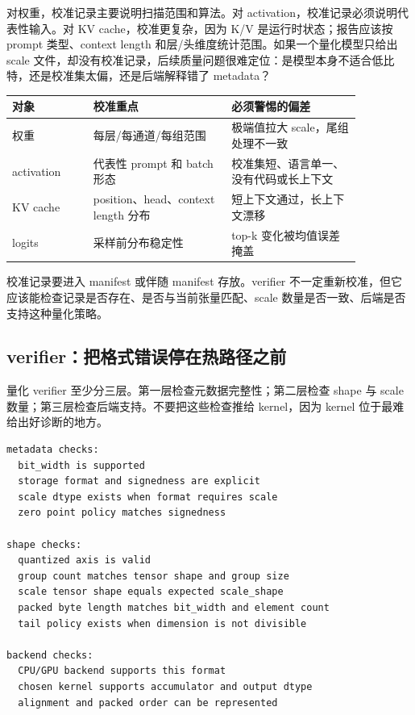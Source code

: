 对权重，校准记录主要说明扫描范围和算法。对 activation，校准记录必须说明代表性输入。对 KV cache，校准更复杂，因为 K/V 是运行时状态；报告应该按 prompt 类型、context length 和层/头维度统计范围。如果一个量化模型只给出 scale 文件，却没有校准记录，后续质量问题很难定位：是模型本身不适合低比特，还是校准集太偏，还是后端解释错了 metadata？

\begin{center}
\begin{tabular}{p{0.20\linewidth}p{0.34\linewidth}p{0.32\linewidth}}
\toprule
对象 & 校准重点 & 必须警惕的偏差 \\
\midrule
权重 & 每层/每通道/每组范围 & 极端值拉大 scale，尾组处理不一致 \\
activation & 代表性 prompt 和 batch 形态 & 校准集短、语言单一、没有代码或长上下文 \\
KV cache & position、head、context length 分布 & 短上下文通过，长上下文漂移 \\
logits & 采样前分布稳定性 & top-k 变化被均值误差掩盖 \\
\bottomrule
\end{tabular}
\end{center}

校准记录要进入 manifest 或伴随 manifest 存放。verifier 不一定重新校准，但它应该能检查记录是否存在、是否与当前张量匹配、scale 数量是否一致、后端是否支持这种量化策略。

\subsection{verifier：把格式错误停在热路径之前}

量化 verifier 至少分三层。第一层检查元数据完整性；第二层检查 shape 与 scale 数量；第三层检查后端支持。不要把这些检查推给 kernel，因为 kernel 位于最难给出好诊断的地方。

\begin{lstlisting}[numbers=none,caption={量化 verifier 的分层检查}]
metadata checks:
  bit_width is supported
  storage format and signedness are explicit
  scale dtype exists when format requires scale
  zero point policy matches signedness

shape checks:
  quantized axis is valid
  group count matches tensor shape and group size
  scale tensor shape equals expected scale_shape
  packed byte length matches bit_width and element count
  tail policy exists when dimension is not divisible

backend checks:
  CPU/GPU backend supports this format
  chosen kernel supports accumulator and output dtype
  alignment and packed order can be represented
\end{lstlisting}

